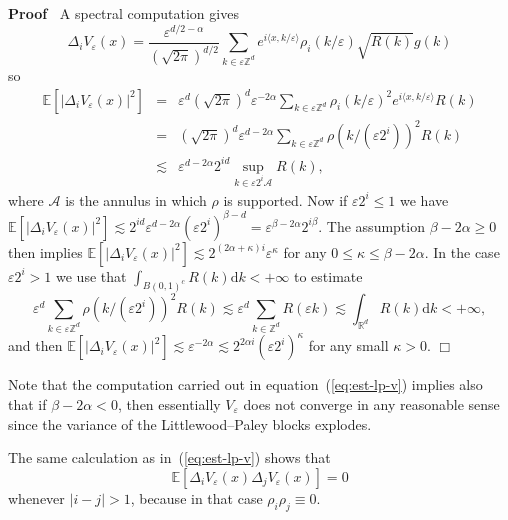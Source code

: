 \documentclass[a4paper,11pt]{article}
\newcommand{\mathd}{\mathrm{d}}
\newenvironment{proof}{\noindent\textbf{Proof\ }}{\hspace*{\fill}$\Box$\medskip}
\newcommand{\CA}{\mathscr{A}}
\begin{document}
\begin{proof}
  A spectral computation gives
  \[ \Delta_i V_{\varepsilon} (x) = \frac{\varepsilon^{d / 2 - \alpha}}{(
     \sqrt{2 \pi} )^{d / 2}} \sum_{k \in \varepsilon \mathbb{Z}^d}
     e^{i \langle x, k / \varepsilon \rangle} \rho_i (k / \varepsilon) \sqrt{R
     (k)} g (k) \]
  so
  \begin{equation}
    \begin{array}{lll}
      \mathbb{E} [| \Delta_i V_{\varepsilon} (x) |^2] & = & \varepsilon^d
      ( \sqrt{2 \pi} )^d \varepsilon^{- 2 \alpha} \sum_{k \in
      \varepsilon \mathbb{Z}^d} \rho_i (k / \varepsilon)^2 e^{i \langle x,
      k / \varepsilon \rangle} R (k)\\
      & = & ( \sqrt{2 \pi} )^d \varepsilon^{d - 2 \alpha} \sum_{k
      \in \varepsilon \mathbb{Z}^d} \rho (k / (\varepsilon 2^i))^2 R (k)\\
      & \lesssim & \varepsilon^{d - 2 \alpha} 2^{id} \sup_{k \in \varepsilon
      2^i \CA} R (k),
    \end{array} \label{eq:est-lp-v}
  \end{equation}
  where $\CA$ is the annulus in which $\rho$ is supported. Now if $\varepsilon
  2^i \leqslant 1$ we have \ $\mathbb{E} [| \Delta_i V_{\varepsilon} (x) |^2]
  \lesssim 2^{id} \varepsilon^{d - 2 \alpha} (\varepsilon 2^i)^{\beta - d} =
  \varepsilon^{\beta - 2 \alpha} 2^{i \beta}$. The assumption $\beta - 2
  \alpha \geqslant 0$ then implies $\mathbb{E} [| \Delta_i V_{\varepsilon}
  (x) |^2] \lesssim 2^{(2 \alpha + \kappa) i} \varepsilon^{\kappa}$ for any $0
  \leqslant \kappa \leqslant \beta - 2 \alpha$. In the case $\varepsilon 2^i >
  1$ we use that $\int_{B (0, 1)^c} R (k) \mathd k < + \infty$ to estimate
  \[ \varepsilon^d \sum_{k \in \varepsilon \mathbb{Z}^d} \rho (k /
     (\varepsilon 2^i))^2 R (k) \lesssim \varepsilon^d \sum_{k \in
     \mathbb{Z}^d} R (\varepsilon k) \lesssim \int_{\mathbb{R}^d} R (k)
     \mathd k < + \infty, \]
  and then $\mathbb{E} [| \Delta_i V_{\varepsilon} (x) |^2] \lesssim
  \varepsilon^{- 2 \alpha} \lesssim 2^{2 \alpha i} (\varepsilon 2^i)^{\kappa}$
  for any small $\kappa > 0$. 
\end{proof}

Note that the computation carried out in equation~(\ref{eq:est-lp-v}) implies
also that if $\beta - 2 \alpha < 0$, then essentially $V_{\varepsilon}$ does
not converge in any reasonable sense since the variance of the
Littlewood--Paley blocks explodes.

\begin{remark}
  \label{rmk:different V blocks orthogonal}The same calculation as
  in~(\ref{eq:est-lp-v}) shows that
  \[ \mathbb{E} [\Delta_i V_{\varepsilon} (x) \Delta_j V_{\varepsilon} (x)] =
     0 \]
  whenever $| i - j | > 1$, because in that case $\rho_i \rho_j \equiv 0$.
\end{remark}
\end{document}
